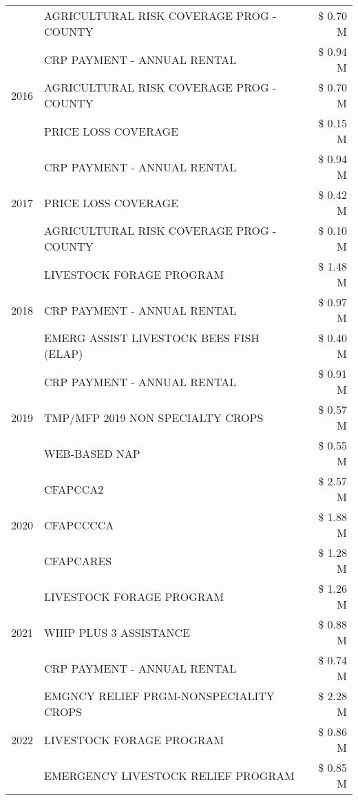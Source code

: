 \begin{tabular}{llr}
 & AGRICULTURAL RISK COVERAGE PROG - COUNTY & \$ 0.70 M \\
\cline{1-3}
\multirow[t]{3}{*}{2016} & CRP PAYMENT - ANNUAL RENTAL & \$ 0.94 M \\
 & AGRICULTURAL RISK COVERAGE PROG - COUNTY & \$ 0.70 M \\
 & PRICE LOSS COVERAGE & \$ 0.15 M \\
\cline{1-3}
\multirow[t]{3}{*}{2017} & CRP PAYMENT - ANNUAL RENTAL & \$ 0.94 M \\
 & PRICE LOSS COVERAGE & \$ 0.42 M \\
 & AGRICULTURAL RISK COVERAGE PROG - COUNTY & \$ 0.10 M \\
\cline{1-3}
\multirow[t]{3}{*}{2018} & LIVESTOCK FORAGE PROGRAM & \$ 1.48 M \\
 & CRP PAYMENT - ANNUAL RENTAL & \$ 0.97 M \\
 & EMERG ASSIST LIVESTOCK BEES FISH (ELAP) & \$ 0.40 M \\
\cline{1-3}
\multirow[t]{3}{*}{2019} & CRP PAYMENT - ANNUAL RENTAL & \$ 0.91 M \\
 & TMP/MFP 2019 NON SPECIALTY CROPS & \$ 0.57 M \\
 & WEB-BASED NAP & \$ 0.55 M \\
\cline{1-3}
\multirow[t]{3}{*}{2020} & CFAPCCA2 & \$ 2.57 M \\
 & CFAPCCCCA & \$ 1.88 M \\
 & CFAPCARES & \$ 1.28 M \\
\cline{1-3}
\multirow[t]{3}{*}{2021} & LIVESTOCK FORAGE PROGRAM & \$ 1.26 M \\
 & WHIP PLUS 3 ASSISTANCE & \$ 0.88 M \\
 & CRP PAYMENT - ANNUAL RENTAL & \$ 0.74 M \\
\cline{1-3}
\multirow[t]{3}{*}{2022} & EMGNCY RELIEF PRGM-NONSPECIALITY CROPS & \$ 2.28 M \\
 & LIVESTOCK FORAGE PROGRAM & \$ 0.86 M \\
 & EMERGENCY LIVESTOCK RELIEF PROGRAM & \$ 0.85 M \\
\cline{1-3}
\bottomrule
\end{tabular}
